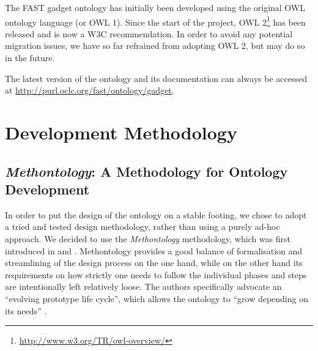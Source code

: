 \documentclass{article}
\begin{document}
The FAST gadget ontology has initially been developed using the original OWL ontology language (or OWL 1). Since the start of the project, OWL 2\footnote{\url{http://www.w3.org/TR/owl-overview/}} has been released and is now a W3C recommendation. In order to avoid any potential migration issues, we have so far refrained from adopting OWL 2, but may do so in the future.

The latest version of the ontology and its documentation can always be accessed at \url{http://purl.oclc.org/fast/ontology/gadget}.


% 

\clearpage
{}
\appendix

\section{Development Methodology}
\label{sec:methodology}

\subsection{\emph{Methontology}: A Methodology for Ontology Development} %
\label{sub:methontology_a_methodology_for_ontology_development}

In order to put the design of the ontology on a stable footing, we chose to adopt a tried and tested design methodology, rather than using a purely ad-hoc approach. We decided to use the \emph{Methontology} methodology, which was first introduced in \cite{gomez_perez1996conceptualise_ontologies} and \cite{fernandez1997methontology}. Methontology provides a good balance of formalisation and streamlining of the design process on the one hand, while on the other hand its requirements on how strictly one needs to follow the individual phases and steps are intentionally left relatively loose.
The authors specifically advocate an ``evolving prototype life cycle'', which allows the ontology to ``grow depending on its needs'' \cite{fernandez1997methontology}.
\end{document}
